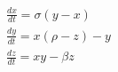 \documentclass[preview]{standalone}
\begin{document}
\begin{align*}
\frac{d x }{dt} = \sigma ( y  -  x ) \\
            \frac{d y }{dt} =  x  (\rho -  z ) -  y  \\
            \frac{d z }{dt} =  x   y  - \beta  z
\end{align*}
\end{document}
